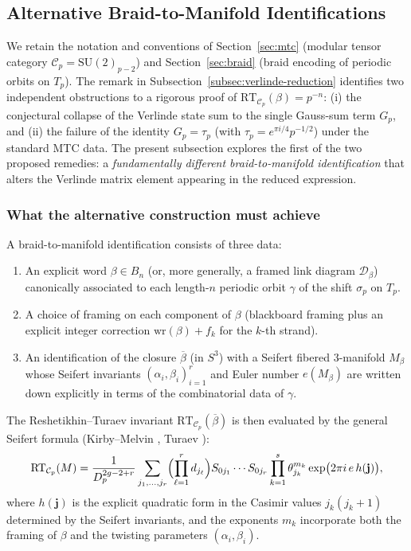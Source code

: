 \subsection{Alternative Braid-to-Manifold Identifications}
\label{subsec:alternative-identification}

We retain the notation and conventions of Section~\ref{sec:mtc} (modular tensor category \(\mathcal{C}_p = \mathrm{SU}(2)_{p-2}\)) and Section~\ref{sec:braid} (braid encoding of periodic orbits on \(T_p\)). The remark in Subsection~\ref{subsec:verlinde-reduction} identifies two independent obstructions to a rigorous proof of \(\mathrm{RT}_{\mathcal{C}_p}(\beta) = p^{-n}\): (i) the conjectural collapse of the Verlinde state sum to the single Gauss-sum term \(G_p\), and (ii) the failure of the identity \(G_p = \tau_p\) (with \(\tau_p = e^{\pi i/4} p^{-1/2}\)) under the standard MTC data. The present subsection explores the first of the two proposed remedies: a \emph{fundamentally different braid-to-manifold identification} that alters the Verlinde matrix element appearing in the reduced expression.

\subsubsection{What the alternative construction must achieve}
A braid-to-manifold identification consists of three data:
\begin{enumerate}
\item An explicit word \(\beta \in B_n\) (or, more generally, a framed link diagram \(\mathcal{D}_\beta\)) canonically associated to each length-\(n\) periodic orbit \(\gamma\) of the shift \(\sigma_p\) on \(T_p\).
\item A choice of framing on each component of \(\beta\) (blackboard framing plus an explicit integer correction \(\mathrm{wr}(\beta) + f_k\) for the \(k\)-th strand).
\item An identification of the closure \(\overline{\beta}\) (in \(S^3\)) with a Seifert fibered 3-manifold \(M_\beta\) whose Seifert invariants \((\alpha_i, \beta_i)_{i=1}^r\) and Euler number \(e(M_\beta)\) are written down explicitly in terms of the combinatorial data of \(\gamma\).
\end{enumerate}
The Reshetikhin--Turaev invariant \(\mathrm{RT}_{\mathcal{C}_p}(\overline{\beta})\) is then evaluated by the general Seifert formula (Kirby--Melvin \cite{KirbyMelvin}, Turaev \cite{TuraevBook}):
\[
\mathrm{RT}_{\mathcal{C}_p}(M) = \frac{1}{D_p^{2g-2+r}} \sum_{j_1,\dots,j_r} \Bigl( \prod_{\ell=1}^r d_{j_\ell} \Bigr) S_{0j_1}\cdots S_{0j_r} \prod_{k=1}^s \theta_{j_k}^{m_k} \exp\bigl(2\pi i \, e \, h(\mathbf{j})\bigr),
\]
where \(h(\mathbf{j})\) is the explicit quadratic form in the Casimir values \(j_k(j_k+1)\) determined by the Seifert invariants, and the exponents \(m_k\) incorporate both the framing of \(\beta\) and the twisting parameters \((\alpha_i,\beta_i)\).

